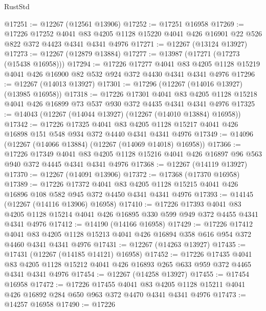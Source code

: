 \begin{lexlean}{RustStd}
\begin{coremodule}
@17251 := @12267 (@12561 @13906)
@17252 := @17251 @16958
@17269 := @17226
    @17252
    @4041
    @83
    @4205
    @1128
    @15220
    @4041
    @426
    @16901
    @22
    @526
    @822
    @372
    @4423
    @4341
    @4341
    @4976
@17271 := @12267 (@13124 @13927)
@17273 := @12267 (@12879 @13884)
@17277 := @13987 (@17271 (@17273 (@15438 @16958)))
@17294 := @17226
    @17277
    @4041
    @83
    @4205
    @1128
    @15219
    @4041
    @426
    @16900
    @82
    @532
    @924
    @372
    @4430
    @4341
    @4341
    @4976
@17296 := @12267 (@14013 @13927)
@17301 := @17296 (@12267 (@14016 @13927) (@13985 @16958))
@17318 := @17226
    @17301
    @4041
    @83
    @4205
    @1128
    @15218
    @4041
    @426
    @16899
    @73
    @537
    @930
    @372
    @4435
    @4341
    @4341
    @4976
@17325 := @14043 (@12267 (@14044 @13927) (@12267 (@14010 @13884) @16958))
@17342 := @17226
    @17325
    @4041
    @83
    @4205
    @1128
    @15217
    @4041
    @426
    @16898
    @151
    @548
    @934
    @372
    @4440
    @4341
    @4341
    @4976
@17349 := @14096 (@12267 (@14066 @13884) (@12267 (@14069 @14018) @16958))
@17366 := @17226
    @17349
    @4041
    @83
    @4205
    @1128
    @15216
    @4041
    @426
    @16897
    @96
    @563
    @940
    @372
    @4445
    @4341
    @4341
    @4976
@17368 := @12267 (@14119 @13927)
@17370 := @12267 (@14091 @13906)
@17372 := @17368 (@17370 @16958)
@17389 := @17226
    @17372
    @4041
    @83
    @4205
    @1128
    @15215
    @4041
    @426
    @16896
    @108
    @582
    @945
    @372
    @4450
    @4341
    @4341
    @4976
@17393 := @14145 (@12267 (@14116 @13906) @16958)
@17410 := @17226
    @17393
    @4041
    @83
    @4205
    @1128
    @15214
    @4041
    @426
    @16895
    @330
    @599
    @949
    @372
    @4455
    @4341
    @4341
    @4976
@17412 := @14190 (@14166 @16958)
@17429 := @17226
    @17412
    @4041
    @83
    @4205
    @1128
    @15213
    @4041
    @426
    @16894
    @358
    @616
    @954
    @372
    @4460
    @4341
    @4341
    @4976
@17431 := @12267 (@14263 @13927)
@17435 := @17431 (@12267 (@14185 @14121) @16958)
@17452 := @17226
    @17435
    @4041
    @83
    @4205
    @1128
    @15212
    @4041
    @426
    @16893
    @265
    @633
    @959
    @372
    @4465
    @4341
    @4341
    @4976
@17454 := @12267 (@14258 @13927)
@17455 := @17454 @16958
@17472 := @17226
    @17455
    @4041
    @83
    @4205
    @1128
    @15211
    @4041
    @426
    @16892
    @284
    @650
    @963
    @372
    @4470
    @4341
    @4341
    @4976
@17473 := @14257 @16958
@17490 := @17226

\end{coremodule}
\end{lexlean}

